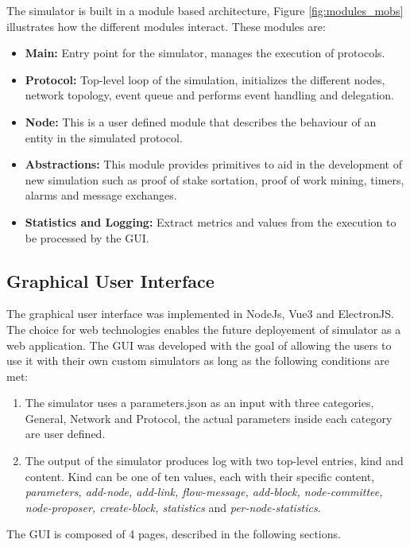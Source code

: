 The simulator is built in a module based architecture, Figure \ref{fig:modules_mobs} illustrates
how the different modules interact. These modules are:
\begin{itemize}
  \item \textbf{Main:} Entry point for the simulator, manages the execution of
protocols.
  \item \textbf{Protocol:} Top-level loop of the simulation, initializes the different
nodes, network topology, event queue and performs event handling and delegation.
  \item \textbf{Node:} This is a user defined module that describes the behaviour
of an entity in the simulated protocol.
  \item \textbf{Abstractions:} This module provides primitives to aid in the
development of new simulation such as proof of stake sortation, proof of work mining,
timers, alarms and message exchanges.
  \item \textbf{Statistics and Logging:}  Extract metrics and values from the execution
to be processed by the GUI.
\end{itemize}

\subsection{Graphical User Interface}
\label{subsec:grafical_user_interface}

The graphical user interface was implemented in NodeJs, Vue3 and ElectronJS.
The choice for web technologies enables the future deployement of simulator as
a web application. The GUI was developed with the goal of allowing the users
to use it with their own custom simulators as long as the following conditions are met:

\begin{enumerate}
  \item The simulator uses a parameters.json as an input with three categories,
General, Network and Protocol, the actual parameters inside each category are user defined.
  \item The output of the simulator produces log with two top-level entries, kind and content.
Kind can be one of ten values, each with their specific content, \textit{parameters, 
add-node, add-link, flow-message, add-block, node-committee, node-proposer, create-block,
statistics} and \textit{per-node-statistics}.
\end{enumerate}

The GUI is composed of 4 pages, described in the following sections.

